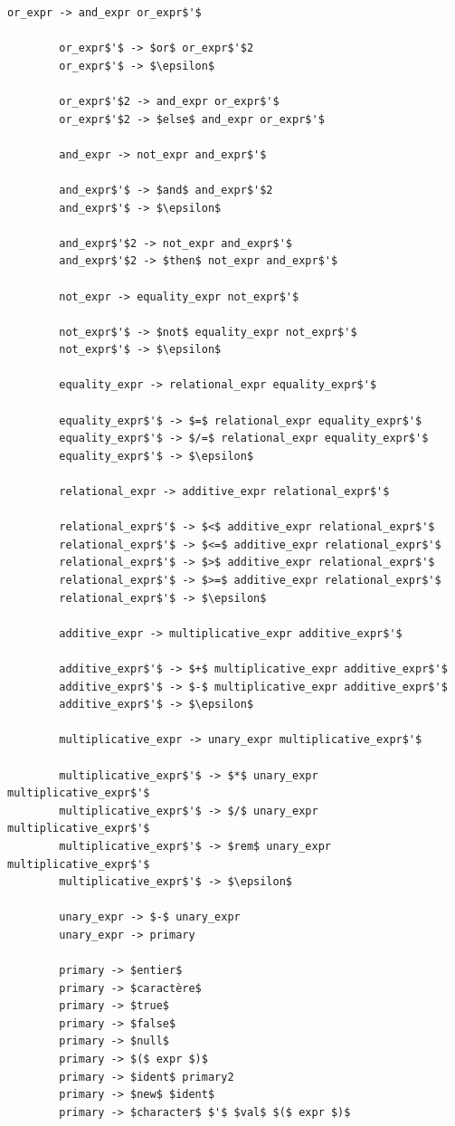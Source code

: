 \documentclass[french,a4paper]{article}
\begin{document}
\begin{lstlisting}[label={lst:lstlisting9}]
        or_expr -> and_expr or_expr$'$

        or_expr$'$ -> $or$ or_expr$'$2
        or_expr$'$ -> $\epsilon$

        or_expr$'$2 -> and_expr or_expr$'$
        or_expr$'$2 -> $else$ and_expr or_expr$'$

        and_expr -> not_expr and_expr$'$

        and_expr$'$ -> $and$ and_expr$'$2
        and_expr$'$ -> $\epsilon$

        and_expr$'$2 -> not_expr and_expr$'$
        and_expr$'$2 -> $then$ not_expr and_expr$'$

        not_expr -> equality_expr not_expr$'$

        not_expr$'$ -> $not$ equality_expr not_expr$'$
        not_expr$'$ -> $\epsilon$

        equality_expr -> relational_expr equality_expr$'$

        equality_expr$'$ -> $=$ relational_expr equality_expr$'$
        equality_expr$'$ -> $/=$ relational_expr equality_expr$'$
        equality_expr$'$ -> $\epsilon$

        relational_expr -> additive_expr relational_expr$'$

        relational_expr$'$ -> $<$ additive_expr relational_expr$'$
        relational_expr$'$ -> $<=$ additive_expr relational_expr$'$
        relational_expr$'$ -> $>$ additive_expr relational_expr$'$
        relational_expr$'$ -> $>=$ additive_expr relational_expr$'$
        relational_expr$'$ -> $\epsilon$

        additive_expr -> multiplicative_expr additive_expr$'$

        additive_expr$'$ -> $+$ multiplicative_expr additive_expr$'$
        additive_expr$'$ -> $-$ multiplicative_expr additive_expr$'$
        additive_expr$'$ -> $\epsilon$

        multiplicative_expr -> unary_expr multiplicative_expr$'$

        multiplicative_expr$'$ -> $*$ unary_expr multiplicative_expr$'$
        multiplicative_expr$'$ -> $/$ unary_expr multiplicative_expr$'$
        multiplicative_expr$'$ -> $rem$ unary_expr multiplicative_expr$'$
        multiplicative_expr$'$ -> $\epsilon$

        unary_expr -> $-$ unary_expr
        unary_expr -> primary

        primary -> $entier$
        primary -> $caractère$
        primary -> $true$
        primary -> $false$
        primary -> $null$
        primary -> $($ expr $)$
        primary -> $ident$ primary2
        primary -> $new$ $ident$
        primary -> $character$ $'$ $val$ $($ expr $)$


\end{lstlisting}
\end{document}
